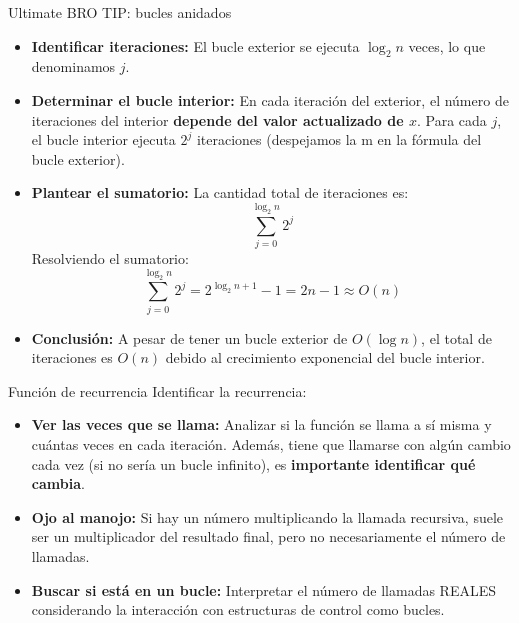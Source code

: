 \documentclass[aspectratio=169]{beamer}
\begin{document}
\begin{frame}{Ultimate BRO TIP: bucles anidados}
\begin{itemize}
    \item \textbf{Identificar iteraciones:} 
    El bucle exterior se ejecuta $\log_2 n$ veces, lo que denominamos $j$.
    
    \item \textbf{Determinar el bucle interior:} 
    En cada iteración del exterior, el número de iteraciones del interior \textbf{depende del valor actualizado de $x$}. 
    Para cada $j$, el bucle interior ejecuta $2^j$ iteraciones (despejamos la m en la fórmula del bucle exterior).
    
    \item \textbf{Plantear el sumatorio:} 
    La cantidad total de iteraciones es:
    \[
        \sum_{j=0}^{\log_2 n} 2^j
    \]
    Resolviendo el sumatorio:
    \[
        \sum_{j=0}^{\log_2 n} 2^j = 2^{\log_2 n + 1} - 1 = 2n - 1 \approx O(n)
    \]
    
    \item \textbf{Conclusión:} 
    A pesar de tener un bucle exterior de $O(\log n)$, el total de iteraciones es $O(n)$ debido al crecimiento exponencial del bucle interior.
\end{itemize}
\end{frame}

\begin{frame}{Función de recurrencia}
Identificar la recurrencia:
\begin{itemize}
    
    \item \textbf{Ver las veces que se llama:} Analizar si la función se llama a sí misma y cuántas veces en cada iteración. Además, tiene que llamarse con algún cambio cada vez (si no sería un bucle infinito), es \textbf{importante identificar qué cambia}.
    
    \item \textbf{Ojo al manojo:} Si hay un número multiplicando la llamada recursiva, suele ser un multiplicador del resultado final, pero no necesariamente el número de llamadas.
    
    \item \textbf{Buscar si está en un bucle:} Interpretar el número de llamadas REALES considerando la interacción con estructuras de control como bucles.
\end{itemize}
\end{frame}
\end{document}
